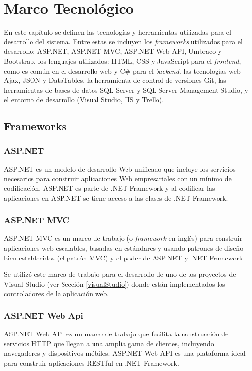 \chapter{Marco Tecnológico}
En este capítulo se definen las tecnologías y herramientas utilizadas para el desarrollo del sistema. Entre estas se incluyen los \textit{frameworks} utilizados para el desarrollo: ASP.NET, ASP.NET MVC, ASP.NET Web API, Umbraco y Bootstrap, los lenguajes utilizados: HTML, CSS y JavaScript para el \textit{frontend}, como es común en el desarrollo web y C\# para el \textit{backend}, las tecnologías web Ajax, JSON y DataTables, la herramienta de control de versiones Git, las herramientas de bases de datos SQL Server y SQL Server Management Studio, y el entorno de desarrollo (Visual Studio, IIS y Trello).

\section{Frameworks}
    \subsection{ASP.NET}
    ASP.NET \cite{asp.netMicrosoft} es un modelo de desarrollo Web unificado que incluye los servicios necesarios para construir aplicaciones Web empresariales con un mínimo de codificación. ASP.NET es parte de .NET Framework y al codificar las aplicaciones en ASP.NET se tiene acceso a las clases de .NET Framework.

    \subsection{ASP.NET MVC}
    ASP.NET MVC \cite{asp.netMVCMicrosoft} es un marco de trabajo (o \textit{framework} en inglés) para construir aplicaciones web escalables, basadas en estándares y usando patrones de diseño bien establecidos (el patrón MVC) y el poder de ASP.NET y .NET Framework.

    Se utilizó este marco de trabajo para el desarrollo de uno de los proyectos de Visual Studio (ver Sección \ref{visualStudio}) donde están implementados los controladores de la aplicación web.

    \subsection{ASP.NET Web Api}
    ASP.NET Web API \cite{asp.netWebAPIMicrosoft} es un marco de trabajo que facilita la construcción de servicios HTTP que llegan a una amplia gama de clientes, incluyendo navegadores y dispositivos móbiles. ASP.NET Web API es una plataforma ideal para construir aplicaciones RESTful en .NET Framework.

